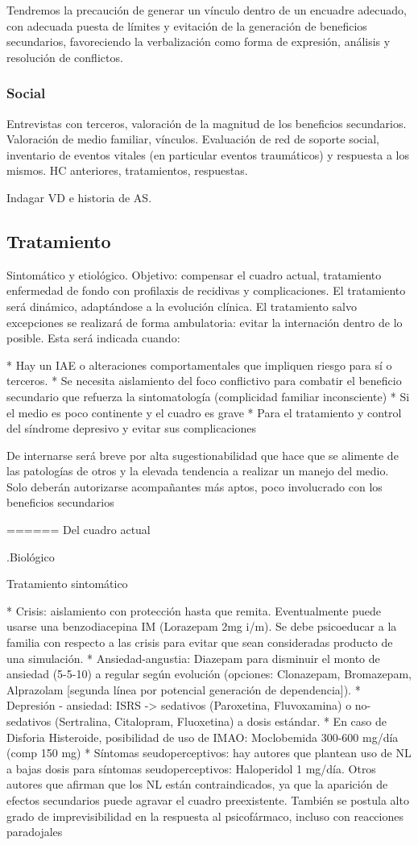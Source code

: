 \documentclass{scrbook}
\begin{document}
Tendremos la precaución de generar un vínculo dentro de un encuadre adecuado, con adecuada puesta de límites y evitación de la generación de beneficios secundarios, favoreciendo la verbalización como forma de expresión, análisis y resolución de conflictos.
\subsubsection*{Social}
Entrevistas con terceros, valoración de la magnitud de los beneficios secundarios. Valoración de medio familiar, vínculos. Evaluación de red de soporte social, inventario de eventos vitales (en particular eventos traumáticos) y respuesta a los mismos. HC anteriores, tratamientos, respuestas.

Indagar VD e historia de AS.
\subsection*{Tratamiento}
Sintomático y etiológico. Objetivo: compensar el cuadro actual, tratamiento enfermedad de fondo con profilaxis de recidivas y complicaciones. El tratamiento será dinámico, adaptándose a la evolución clínica.
El tratamiento salvo excepciones se realizará de forma ambulatoria: evitar la internación dentro de lo posible. Esta será indicada cuando:

* Hay un IAE o alteraciones comportamentales que impliquen riesgo para sí o terceros.
* Se necesita aislamiento del foco conflictivo para combatir el beneficio secundario que refuerza la sintomatología (complicidad familiar inconsciente)
* Si el medio es poco continente y el cuadro es grave
* Para el tratamiento y control del síndrome depresivo y evitar sus complicaciones

De internarse será breve por alta sugestionabilidad que hace que se alimente de las patologías de otros y la elevada tendencia a realizar un manejo del medio. Solo deberán autorizarse acompañantes más aptos, poco involucrado con los beneficios secundarios

====== Del cuadro actual

.Biológico

Tratamiento sintomático

* Crisis: aislamiento con protección hasta que remita. Eventualmente puede usarse una benzodiacepina IM (Lorazepam 2mg i/m). Se debe psicoeducar a la familia con respecto a las crisis para evitar que sean consideradas producto de una simulación.
* Ansiedad-angustia: Diazepam para disminuir el monto de ansiedad (5-5-10) a regular según evolución (opciones: Clonazepam, Bromazepam, Alprazolam [segunda línea por potencial generación de dependencia]).
* Depresión - ansiedad: ISRS -> sedativos (Paroxetina, Fluvoxamina) o no-sedativos (Sertralina, Citalopram, Fluoxetina) a dosis estándar.
* En caso de Disforia Histeroide, posibilidad de uso de IMAO: Moclobemida 300-600 mg/día (comp 150 mg) 
* Síntomas seudoperceptivos: hay autores que plantean uso de NL a bajas dosis para síntomas seudoperceptivos: Haloperidol 1 mg/día. Otros autores que afirman que los NL están contraindicados, ya que la aparición de efectos secundarios puede agravar el cuadro preexistente. También se postula alto grado de imprevisibilidad en la respuesta al psicofármaco, incluso con reacciones paradojales
\end{document}
